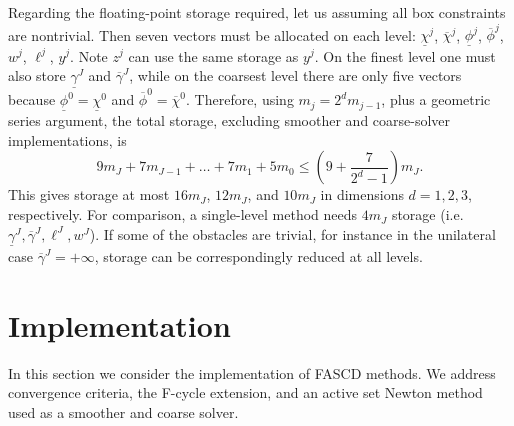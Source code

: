 \documentclass[letterpaper,final,12pt,reqno]{amsart}
\theoremstyle{cstyle}
\theoremstyle{cstyle*}
\theoremstyle{dstyle}
\numberwithin{equation}{section}
\numberwithin{figure}{section}
\numberwithin{table}{section}
\numberwithin{theorem}{section}
\begin{document}
Regarding the floating-point storage required, let us assuming all box constraints are nontrivial.  Then seven vectors must be allocated on each level: $\underline{\chi}^j$, $\overline{\chi}^j$, $\underline{\phi}^j$, $\overline{\phi}^j$, $w^j$, $\ell^j$, $y^j$.  Note $z^j$ can use the same storage as $y^j$.  On the finest level one must also store $\underline{\gamma}^J$ and $\overline{\gamma}^J$, while on the coarsest level there are only five vectors because $\underline{\phi}^0=\underline{\chi}^0$ and $\overline{\phi}^0=\overline{\chi}^0$.  Therefore, using $m_j=2^d m_{j-1}$, plus a geometric series argument, the total storage, excluding smoother and coarse-solver implementations, is
\begin{equation}
9 m_J + 7 m_{J-1} + \dots + 7 m_1 + 5 m_0 \le \left(9 + \frac{7}{2^d - 1}\right) m_J.
\end{equation}
This gives storage at most $16m_J$, $12m_J$, and $10m_J$ in dimensions $d=1,2,3$, respectively.  For comparison, a single-level method needs $4 m_J$ storage (i.e.~$\underline{\gamma}^J,\overline{\gamma}^J,\ell^J,w^J$).  If some of the obstacles are trivial, for instance in the unilateral case $\overline{\gamma}^J=+\infty$, storage can be correspondingly reduced at all levels.


\section{Implementation} \label{sec:implementation}

In this section we consider the implementation of FASCD methods.  We address convergence criteria, the F-cycle extension, and an active set Newton method used as a smoother and coarse solver.
\end{document}
